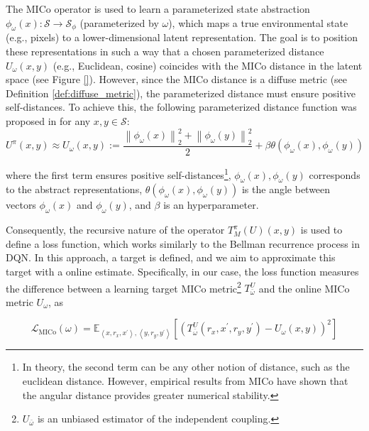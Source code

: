 The MICo operator is used to learn a parameterized state abstraction \(\phi_\omega(x) : \mathcal{S} \to \mathcal{S}_\phi\) (parameterized by \(\omega\)), which maps a true environmental state (e.g., pixels) to a lower-dimensional latent representation. The goal is to position these representations in such a way that a chosen parameterized distance $U_\omega(x,y)$ (e.g., Euclidean, cosine) coincides with the MICo distance in the latent space (see Figure \ref{}). However, since the MICo distance is a diffuse metric (see Definition \ref{def:diffuse_metric}), the parameterized distance must ensure positive self-distances. To achieve this, the following parameterized distance function was proposed in \cite{castro2021mico} for any \(x, y \in \mathcal{S}\):
\begin{equation}
    U^\pi(x, y) \approx U_\omega(x, y):=\frac{\left\|\phi_\omega(x)\right\|_2^2+\left\|\phi_\omega(y)\right\|_2^2}{2}+\beta \theta\left(\phi_\omega(x), \phi_\omega(y)\right)
\end{equation}

where the first term ensures positive self-distances\footnote{In theory, the second term can be any other notion of distance, such as the euclidean distance. However, empirical results from MICo\cite{castro2021mico} have shown that the angular distance provides greater numerical stability.}, $\phi_\omega(x), \phi_\omega(y)$ corresponds to the abstract representations, $\theta\left(\phi_\omega(x), \phi_\omega(y)\right)$ is the angle between vectors $\phi_\omega(x)$ and $\phi_\omega(y)$, and $\beta$ is an hyperparameter.

Consequently, the recursive nature of the operator \(T_M^\pi(U)(x,y)\) is used to define a loss function, which works similarly to the Bellman recurrence process in DQN. In this approach, a target is defined, and we aim to approximate this target with a online estimate. Specifically, in our case, the loss function measures the difference between a learning target MICo metric\footnote{\(U_{\bar{\omega}}\) is an unbiased estimator of the independent coupling.} \(T_{\bar{\omega}}^U\) and the online MICo metric \(U_\omega\), as 

\begin{equation}
\label{eq:mico_loss}
    \mathcal{L}_{\mathrm{MICo}}(\omega)=\mathbb{E}_{\left\langle x, r_x, x^{\prime}\right\rangle,\left\langle y, r_y, y^{\prime}\right\rangle}\left[\left(T_{\bar{\omega}}^U\left(r_x, x^{\prime}, r_y, y^{\prime}\right)-U_\omega(x, y)\right)^2\right]
\end{equation}

